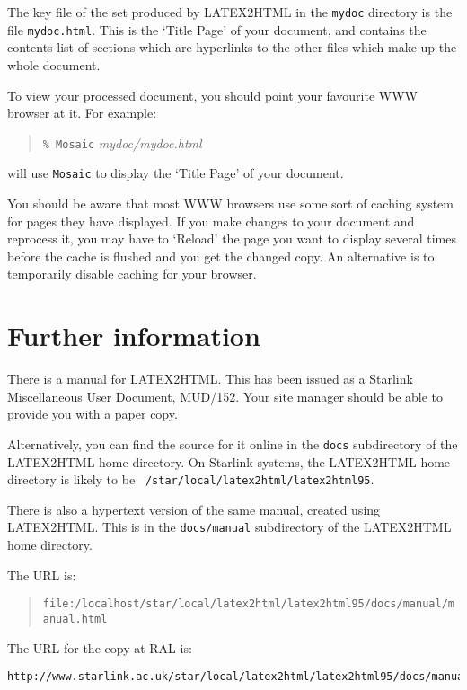 \documentclass[twoside,11pt]{article}
\newcommand{\htmladdnormallink}[2]{#1}
\newcommand{\xlabel}[1]{}
\begin{document}
The key file of the set produced by LATEX2HTML in the {\tt mydoc}
directory is the file {\tt mydoc.html}.  This is the `Title Page' of
your document, and contains the contents list of sections which are
hyperlinks to the other files which make up the whole document.

To view your processed document, you should point your favourite WWW
browser at it.  For example:

\begin{quote}
{\tt \% Mosaic} {\it mydoc/mydoc.html}
\end{quote}

will use {\tt Mosaic} to display the `Title Page' of your document.

You should be aware that most WWW browsers use some sort of caching
system for pages they have displayed.  If you make changes to your
document and reprocess it, you may have to `Reload' the page you want to
display several times before the cache is flushed and you get the
changed copy.  An alternative is to temporarily disable caching for
your browser.

\section{Further information\xlabel{further_information}}

There is a manual for LATEX2HTML.  This has been issued as a Starlink
Miscellaneous User Document, MUD/152.  Your site manager should be able
to provide you with a paper copy.

Alternatively, you can find the source for it online in the {\tt docs}
subdirectory of the LATEX2HTML home directory.  On Starlink systems,
the LATEX2HTML home directory is likely to be {\tt
/star/\-local/latex2html/latex2html95}.

There is also a hypertext version of the same manual, created using
LATEX2HTML.  This is in the {\tt docs/manual} subdirectory of the
LATEX2HTML home directory.

The URL is:

\begin{quote}
{\small
{\tt file:/localhost/star/local/latex2html/latex2html95/docs/manual/manual.html}
}
\end{quote}

The URL for the
\htmladdnormallink{copy at RAL}
{http://www.starlink.ac.uk/star/local/latex2html/latex2html95/docs/manual/manual.html}
is:

{\small
\begin{verbatim}
http://www.starlink.ac.uk/star/local/latex2html/latex2html95/docs/manual/manual.html
\end{verbatim}
}
\end{document}

